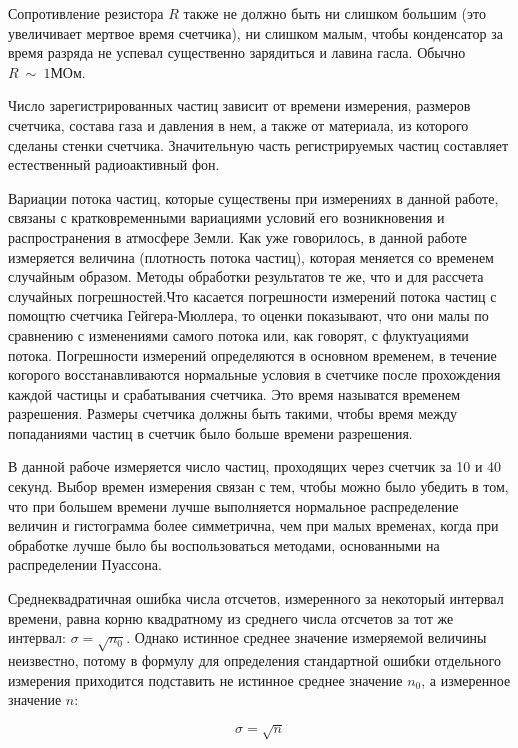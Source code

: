 \documentclass[14pt]{article}
\begin{document}
Сопротивление резистора $R$ также не должно быть ни слишком большим (это увеличивает мертвое время счетчика), ни слишком малым, чтобы конденсатор за время разряда не успевал существенно зарядиться и лавина гасла. Обычно $~$ $R~\sim~1\text{МОм}$.

Число зарегистрированных частиц зависит от времени измерения, размеров счетчика, состава газа и давления в нем, а также от материала, из которого сделаны стенки счетчика. Значительную часть регистрируемых частиц составляет естественный радиоактивный фон.

Вариации потока частиц, которые существены при измерениях в данной работе, связаны с кратковременными вариациями условий его
возникновения и распространения в атмосфере Земли. Как уже говорилось, в данной работе измеряется величина (плотность потока частиц), которая меняется со временем случайным образом. Методы обработки результатов те же, что и для рассчета случайных погрешностей.Что касается погрешности измерений потока частиц с помощтю счетчика Гейгера-Мюллера, то оценки показывают, что они малы по сравнению с изменениями самого потока или, как говорят, с флуктуациями потока. Погрешности измерений определяются в основном временем, в течение когорого восстанавливаются нормальные условия в счетчике после прохождения каждой частицы и срабатывания счетчика. Это время называтся временем разрешения. Размеры счетчика должны быть такими, чтобы время между попаданиями частиц в счетчик было больше времени разрешения.

В данной рабоче измеряется число частиц, проходящих через счетчик за 10 и 40 секунд. Выбор времен измерения связан с тем, чтобы можно было убедить в том, что при большем времени лучше выполняется нормальное распределение величин и гистограмма более симметрична, чем при малых временах, когда при обработке лучше было бы воспользоваться методами, основанными на распределении Пуассона. 

\vspace{0.5cm}
Среднеквадратичная ошибка числа отсчетов, измеренного за некоторый интервал времени, равна корню квадратному из среднего числа отсчетов за тот же интервал: $\sigma = \sqrt{n_0}$. Однако истинное среднее значение измеряемой величины неизвестно, потому в формулу для определения стандартной ошибки отдельного измерения приходится подставить не истинное среднее значение $n_0$, а измеренное значение $n$:

\begin{equation}
\sigma = \sqrt{n}
\end{equation}
\end{document}
